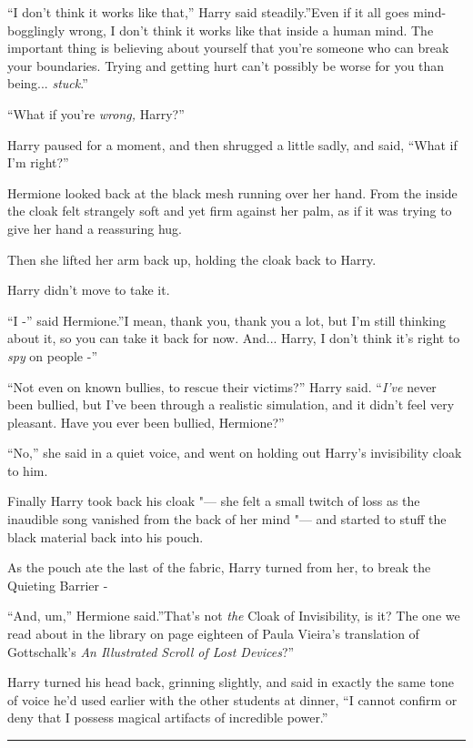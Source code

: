 ``I don't think it works like that,'' Harry said steadily.''Even if it
all goes mind-bogglingly wrong, I don't think it works like that inside
a human mind. The important thing is believing about yourself that
you're someone who can break your boundaries. Trying and getting hurt
can't possibly be worse for you than being... \emph{stuck}.''

``What if you're \emph{wrong,} Harry?''

Harry paused for a moment, and then shrugged a little sadly, and said,
``What if I'm right?''

Hermione looked back at the black mesh running over her hand. From the
inside the cloak felt strangely soft and yet firm against her palm, as
if it was trying to give her hand a reassuring hug.

Then she lifted her arm back up, holding the cloak back to Harry.

Harry didn't move to take it.

``I -'' said Hermione.''I mean, thank you, thank you a lot, but I'm
still thinking about it, so you can take it back for now. And...
Harry, I don't think it's right to \emph{spy} on people -''

``Not even on known bullies, to rescue their victims?'' Harry said.
``\emph{I've} never been bullied, but I've been through a realistic
simulation, and it didn't feel very pleasant. Have you ever been
bullied, Hermione?''

``No,'' she said in a quiet voice, and went on holding out Harry's
invisibility cloak to him.

Finally Harry took back his cloak "--- she felt a small twitch of loss as
the inaudible song vanished from the back of her mind "--- and started to
stuff the black material back into his pouch.

As the pouch ate the last of the fabric, Harry turned from her, to break
the Quieting Barrier -

``And, um,'' Hermione said.''That's not \emph{the} Cloak of
Invisibility, is it? The one we read about in the library on page
eighteen of Paula Vieira's translation of Gottschalk's \emph{An
Illustrated Scroll of Lost Devices}?''

Harry turned his head back, grinning slightly, and said in exactly the
same tone of voice he'd used earlier with the other students at dinner,
``I cannot confirm or deny that I possess magical artifacts of
incredible power.''

\begin{center}\rule{3in}{0.4pt}\end{center}

